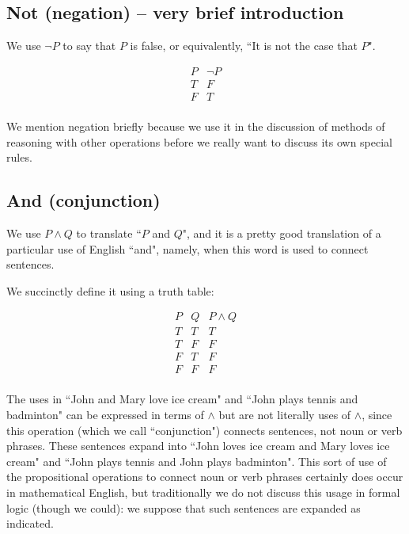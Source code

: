 \documentclass[12pt]{article}
\begin{document}
\subsection{Not (negation) -- very brief introduction}

We use $\neg P$ to say that $P$ is false, or equivalently, ``It is not the case that $P$".

$$\begin{array}{c|c}

P & \neg P \\ \hline
T & F \\
F & T \\
\end{array}$$

We mention negation briefly because we use it in the discussion of methods of reasoning with other operations before we really want to discuss its own special rules.

\subsection{And (conjunction)}

We use $P \wedge Q$ to translate ``$P$ and $Q$", and it is a pretty good translation of a particular use of English ``and", namely, when this word is used to connect sentences.

We succinctly define it using a truth table:

$$\begin{array}{cc|c}
P & Q & P \wedge Q \\ \hline
T & T & T \\
T & F & F \\
F & T & F \\
F & F & F \\
\end{array}$$

The uses in ``John and Mary love ice cream" and ``John plays tennis and badminton" can be expressed in terms of $\wedge$ but are not literally uses of $\wedge$, since this operation (which we call ``conjunction") connects sentences, not noun or verb phrases.  These sentences expand into ``John loves ice cream and Mary loves ice cream" and ``John plays tennis and John plays badminton".  This sort of use of the propositional operations to connect noun or verb phrases certainly does occur in mathematical English, but traditionally we do not discuss this usage in formal logic (though we could):  we suppose that such sentences are expanded as indicated.
\end{document}
